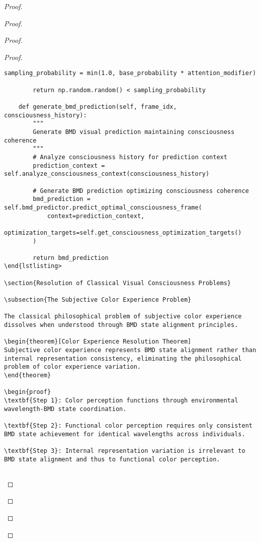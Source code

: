 \documentclass[12pt,a4paper]{article}
\newtheorem{theorem}{Theorem}[section]
\begin{document}
\begin{proof}
{\begin{proof}
\begin{proof}
\begin{proof}
\begin{lstlisting}[style=pythonstyle, caption=Visual Memory BMD Integration]
        sampling_probability = min(1.0, base_probability * attention_modifier)
        
        return np.random.random() < sampling_probability
    
    def generate_bmd_prediction(self, frame_idx, consciousness_history):
        """
        Generate BMD visual prediction maintaining consciousness coherence
        """
        # Analyze consciousness history for prediction context
        prediction_context = self.analyze_consciousness_context(consciousness_history)
        
        # Generate BMD prediction optimizing consciousness coherence
        bmd_prediction = self.bmd_predictor.predict_optimal_consciousness_frame(
            context=prediction_context,
            optimization_targets=self.get_consciousness_optimization_targets()
        )
        
        return bmd_prediction
\end{lstlisting>

\section{Resolution of Classical Visual Consciousness Problems}

\subsection{The Subjective Color Experience Problem}

The classical philosophical problem of subjective color experience dissolves when understood through BMD state alignment principles.

\begin{theorem}[Color Experience Resolution Theorem]
Subjective color experience represents BMD state alignment rather than internal representation consistency, eliminating the philosophical problem of color experience variation.
\end{theorem}

\begin{proof}
\textbf{Step 1}: Color perception functions through environmental wavelength-BMD state coordination.

\textbf{Step 2}: Functional color perception requires only consistent BMD state achievement for identical wavelengths across individuals.

\textbf{Step 3}: Internal representation variation is irrelevant to BMD state alignment and thus to functional color perception.


\end{lstlisting}
\end{proof}
\end{proof}
\end{proof}}
\end{proof}
\end{document}

